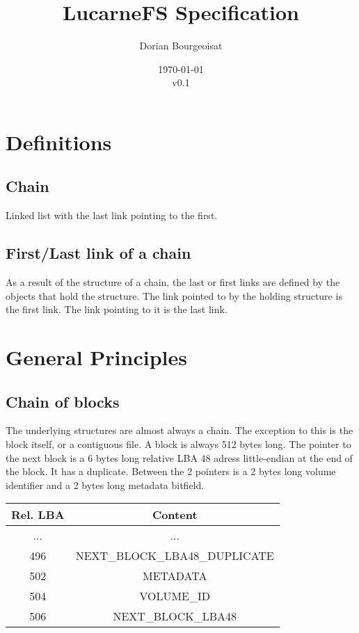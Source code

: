 \documentclass{article}
\title{LucarneFS Specification}
\author{Dorian Bourgeoisat}
\date{\today\\v0.1}
\begin{document}
\maketitle
\newpage
\tableofcontents

\newpage
\section{Definitions}
\subsection{Chain}
Linked list with the last link pointing to the first.
\subsection{First/Last link of a chain}
As a result of the structure of a chain, the last or first links are defined by the objects that hold the structure. The link pointed to by the holding structure is the first link. The link pointing to it is the last link.

\section{General Principles}
\subsection{Chain of blocks}
The underlying structures are almost always a chain. The exception to this is the block itself, or a contiguous file. A block is always 512 bytes long.\newline
The pointer to the next block is a 6 bytes long relative LBA 48 adress little-endian at the end of the block. It has a duplicate. Between the 2 pointers is a 2 bytes long volume identifier and a 2 bytes long metadata bitfield.

\begin{tabular}{|c|c|}
    \hline
    Rel. LBA & Content \\
    \hline
    ... & ...  \\
    \hline
    496 & NEXT\_BLOCK\_LBA48\_DUPLICATE \\
    \hline
    502 & METADATA  \\
    \hline
    504 & VOLUME\_ID  \\
    \hline
    506 & NEXT\_BLOCK\_LBA48  \\
    \hline
  \end{tabular}
\end{document}
